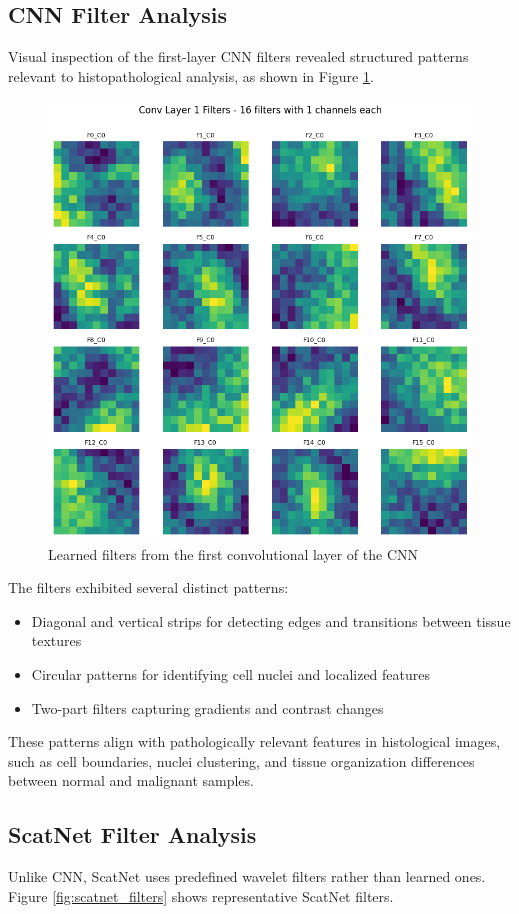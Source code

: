 \documentclass[10pt,twocolumn]{article}
\begin{document}
\subsection{CNN Filter Analysis}
Visual inspection of the first-layer CNN filters revealed structured patterns relevant to histopathological analysis, as shown in Figure \ref{fig:cnn_filters}.

\begin{figure}[h]
\centering
\includegraphics[width=0.8\columnwidth]{imgs/cnn_filters.png}
\caption{Learned filters from the first convolutional layer of the CNN}
\label{fig:cnn_filters}
\end{figure}

The filters exhibited several distinct patterns:
\begin{itemize}
    \item Diagonal and vertical strips for detecting edges and transitions between tissue textures
    \item Circular patterns for identifying cell nuclei and localized features
    \item Two-part filters capturing gradients and contrast changes
\end{itemize}

These patterns align with pathologically relevant features in histological images, such as cell boundaries, nuclei clustering, and tissue organization differences between normal and malignant samples.

\subsection{ScatNet Filter Analysis}
Unlike CNN, ScatNet uses predefined wavelet filters rather than learned ones. Figure \ref{fig:scatnet_filters} shows representative ScatNet filters.
\end{document}
